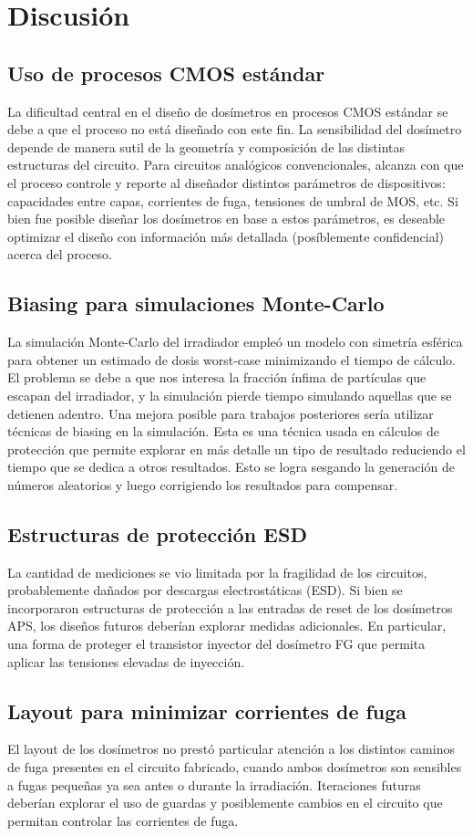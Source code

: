 \section{Discusión}
\subsection{Uso de procesos CMOS estándar}
La dificultad central en el diseño de dosímetros en procesos CMOS estándar
se debe a que el proceso no está diseñado con este fin.
La sensibilidad del dosímetro depende de manera sutil de la geometría y
composición de las distintas estructuras del circuito.
Para circuitos analógicos convencionales, alcanza con que el proceso controle y
reporte al diseñador distintos parámetros de dispositivos: 
capacidades entre capas, corrientes de fuga, tensiones de umbral de MOS, etc. 
Si bien fue posible diseñar los dosímetros en base a estos parámetros,
es deseable optimizar el diseño con información más detallada 
(posíblemente confidencial) acerca del proceso.
\subsection{Biasing para simulaciones Monte-Carlo}
La simulación Monte-Carlo del irradiador empleó un modelo con simetría esférica
para obtener un estimado de dosis worst-case minimizando el tiempo de cálculo.
El problema se debe a que nos interesa la fracción ínfima de partículas que
escapan del irradiador, y la simulación pierde tiempo simulando aquellas que se
detienen adentro.
Una mejora posible para trabajos posteriores sería utilizar técnicas
de biasing en la simulación.
Esta es una técnica usada en cálculos de protección que permite explorar en más
detalle un tipo de resultado reduciendo el tiempo que se dedica a otros
resultados. Esto se logra sesgando la generación de números aleatorios y luego
corrigiendo los resultados para compensar.
\subsection{Estructuras de protección ESD}
La cantidad de mediciones se vio limitada por la fragilidad de los circuitos,
probablemente dañados por descargas electrostáticas (ESD).
Si bien se incorporaron estructuras de protección a las entradas de reset de
los dosímetros APS, los diseños futuros deberían explorar medidas adicionales.
En particular, una forma de proteger el transistor inyector del dosímetro FG
que permita aplicar las tensiones elevadas de inyección.
\subsection{Layout para minimizar corrientes de fuga}
El layout de los dosímetros no prestó particular atención a los distintos
caminos de fuga presentes en el circuito fabricado,
cuando ambos dosímetros son sensibles a fugas pequeñas ya sea antes o durante
la irradiación.
Iteraciones futuras deberían explorar el uso de guardas y posiblemente cambios
en el circuito que permitan controlar las corrientes de fuga.
